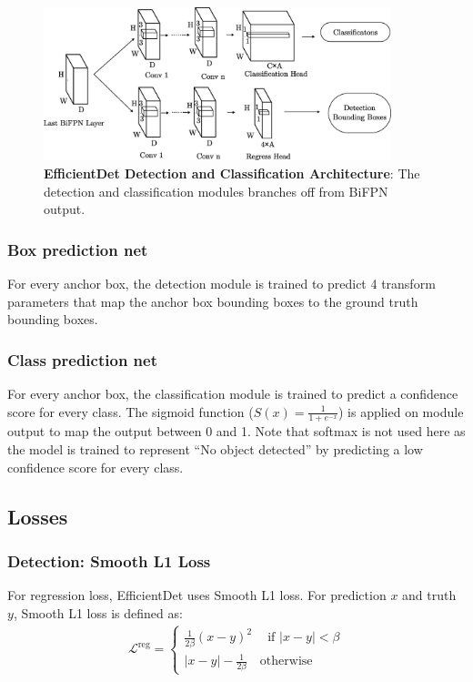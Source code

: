 \documentclass[12pt,a4paper,twoside,openany]{report}
\newcommand{\regloss}{\mathcal{L}^\text{reg}}
\begin{document}
\begin{figure}[h]
    \centering
    \includegraphics[width=0.9\textwidth]{figs/implementation/efficientdet_heads.jpg}
    \caption{\textbf{EfficientDet Detection and Classification Architecture}: The detection and classification modules branches off from BiFPN output.}
    \label{fig:edet_heads}
\end{figure}
\subsubsection{Box prediction net}
For every anchor box, the detection module is trained to predict 4 transform parameters that map the anchor box bounding boxes to the ground truth bounding boxes. 

\subsubsection{Class prediction net}
For every anchor box, the classification module is trained to predict a confidence score for every class. The sigmoid function ($S(x)=\frac{1}{1+e^{-x}}$) is applied on module output to map the output between 0 and 1. Note that softmax is not used here as the model is trained to represent ``No object detected'' by predicting a low confidence score for every class.

\subsection{Losses}
\subsubsection{Detection: Smooth L1 Loss}
For regression loss, EfficientDet uses Smooth L1 loss. For prediction $x$ and truth $y$, Smooth L1 loss is defined as: 
\begin{align} \label{eq:smooth_l1}
    \regloss = \begin{cases}
        \frac{1}{2\beta}(x-y)^2\quad\ \text{if } |x-y| < \beta\\
        |x-y|-\frac{1}{2\beta}\quad \text{otherwise}
    \end{cases}
\end{align}
\end{document}
